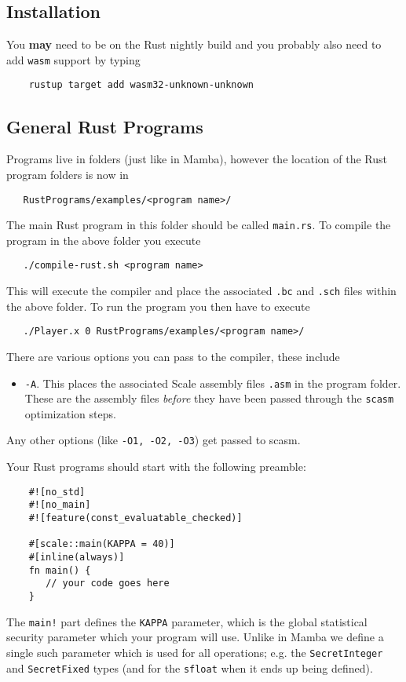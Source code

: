 
\subsection{Installation}
You {\bf may} need to be on the Rust nightly build and
you probably also need to add \verb|wasm| support by typing
\begin{verbatim}
    rustup target add wasm32-unknown-unknown
\end{verbatim}

\subsection{General Rust Programs}
Programs live in folders (just like in Mamba),
however the location of the Rust program folders is now
in
\begin{verbatim}
   RustPrograms/examples/<program name>/
\end{verbatim}
The main Rust program in this folder should be called
\verb|main.rs|. To compile the program in the above
folder you execute
\begin{verbatim}
   ./compile-rust.sh <program name>
\end{verbatim}
This will execute the compiler and place the associated \verb|.bc|
and \verb|.sch| files within the above folder.
To run the program you then have to execute
\begin{verbatim}
   ./Player.x 0 RustPrograms/examples/<program name>/
\end{verbatim}
There are various options you can pass to the compiler,
these include
\begin{itemize}
     \item  \verb|-A|. This places the associated Scale assembly
           files \verb|.asm| in the program folder. These are the
           assembly files {\em before} they have been passed through
           the \verb|scasm| optimization steps.
\end{itemize}
Any other options (like \verb|-O1, -O2, -O3|) get passed to scasm.

\vspace{3mm}

\noindent
Your Rust programs should start with the following preamble:
\begin{lstlisting}
    #![no_std]
    #![no_main]
    #![feature(const_evaluatable_checked)]

    #[scale::main(KAPPA = 40)]
    #[inline(always)]
    fn main() {
       // your code goes here
    }
\end{lstlisting}
The \verb|main!| part defines the \verb|KAPPA| parameter,
which is the global statistical security 
parameter which your program will use. Unlike in Mamba we define a
single such parameter which is used for all operations;
e.g. the \verb|SecretInteger| and \verb|SecretFixed| types
(and for the \verb|sfloat| when it ends up being defined).


